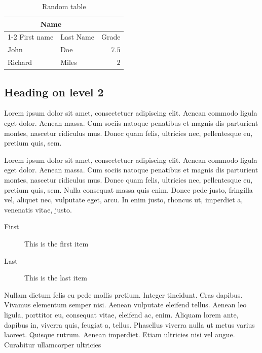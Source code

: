 \documentclass[	DIV=calc,%
							paper=a4,%
							fontsize=11pt,%
							twocolumn]{scrartcl}	 					%
\begin{document}
\begin{table}
\caption{Random table}
\centering
	\begin{tabular}{llr}
		\toprule
		\multicolumn{2}{c}{Name} \\
		\cmidrule(r){1-2}
			First name & Last Name & Grade \\
		\midrule
			John & Doe & $7.5$ \\
			Richard & Miles & $2$ \\
		\bottomrule
	\end{tabular}
\end{table}

\subsection*{Heading on level 2}
Lorem ipsum dolor sit amet, consectetuer adipiscing elit. Aenean commodo ligula eget dolor. Aenean massa. Cum sociis natoque penatibus et magnis dis parturient montes, nascetur ridiculus mus. Donec quam felis, ultricies nec, pellentesque eu, pretium quis, sem. 

Lorem ipsum dolor sit amet, consectetuer adipiscing elit. Aenean commodo ligula eget dolor. Aenean massa. Cum sociis natoque penatibus et magnis dis parturient montes, nascetur ridiculus mus. Donec quam felis, ultricies nec, pellentesque eu, pretium quis, sem. Nulla consequat massa quis enim. Donec pede justo, fringilla vel, aliquet nec, vulputate eget, arcu. In enim justo, rhoncus ut, imperdiet a, venenatis vitae, justo. 
\begin{description}
	\item[First] This is the first item
	\item[Last] This is the last item
\end{description}
Nullam dictum felis eu pede mollis pretium. Integer tincidunt. Cras dapibus. Vivamus elementum semper nisi. Aenean vulputate eleifend tellus. Aenean leo ligula, porttitor eu, consequat vitae, eleifend ac, enim. Aliquam lorem ante, dapibus in, viverra quis, feugiat a, tellus. Phasellus viverra nulla ut metus varius laoreet. Quisque rutrum. Aenean imperdiet. Etiam ultricies nisi vel augue. Curabitur ullamcorper ultricies 
\end{document}
